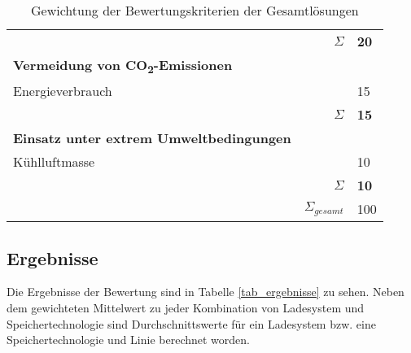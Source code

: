 \begin{table}
\begin{tabularx}{\linewidth}{Xrl}
		                                                         &          $\Sigma$ & \textbf{20}     \\
		\textbf{Vermeidung von CO\textsubscript{2}-Emissionen}   &                   &  \\
		Energieverbrauch                                         &                   & 15              \\ \midrule
		                                                         &          $\Sigma$ & \textbf{15}     \\
		\textbf{Einsatz unter extrem Umweltbedingungen}          &                   &  \\
		Kühlluftmasse                                            &                   & 10              \\ \midrule
		                                                         &          $\Sigma$ & \textbf{10}     \\ \midrule
		                                                         & $\Sigma_{gesamt}$ & 100 \\ \bottomrule
	\end{tabularx}
	\caption{Gewichtung der Bewertungskriterien der Gesamtlösungen}
	\label{tab_bewertungskriterien}
\end{table} 

\subsection{Ergebnisse}
Die Ergebnisse der Bewertung sind in Tabelle \ref{tab_ergebnisse} zu sehen. Neben dem gewichteten Mittelwert zu jeder Kombination von Ladesystem und Speichertechnologie sind Durchschnittswerte für ein Ladesystem bzw. eine Speichertechnologie und Linie berechnet worden.

